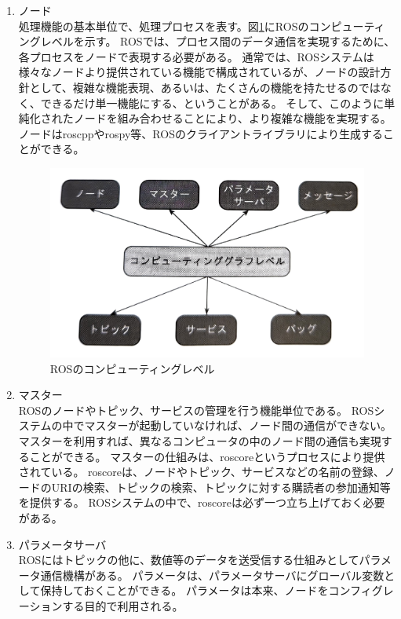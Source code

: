 \begin{enumerate}
  \item ノード\\
  処理機能の基本単位で、処理プロセスを表す。図\ref{auto:compute}にROSのコンピューティングレベルを示す。
  ROSでは、プロセス間のデータ通信を実現するために、各プロセスをノードで表現する必要がある。
  通常では、ROSシステムは様々なノードより提供されている機能で構成されているが、ノードの設計方針として、複雑な機能表現、あるいは、たくさんの機能を持たせるのではなく、できるだけ単一機能にする、ということがある。
  そして、このように単純化されたノードを組み合わせることにより、より複雑な機能を実現する。
  ノードはroscppやrospy等、ROSのクライアントライブラリにより生成することができる。
  \begin{figure}[h]
    \begin{center}
      \includegraphics[width=.75\linewidth]{img/auto_7.pdf}
      \caption{ROSのコンピューティングレベル}
      \label{auto:compute}
    \end{center}
  \end{figure}
  \item マスター\\
  ROSのノードやトピック、サービスの管理を行う機能単位である。
  ROSシステムの中でマスターが起動していなければ、ノード間の通信ができない。
  マスターを利用すれば、異なるコンピュータの中のノード間の通信も実現することができる。
  マスターの仕組みは、roscoreというプロセスにより提供されている。
  roscoreは、ノードやトピック、サービスなどの名前の登録、ノードのURIの検索、トピックの検索、トピックに対する購読者の参加通知等を提供する。
  ROSシステムの中で、roscoreは必ず一つ立ち上げておく必要がある。
  \item パラメータサーバ\\
  ROSにはトピックの他に、数値等のデータを送受信する仕組みとしてパラメータ通信機構がある。
  パラメータは、パラメータサーバにグローバル変数として保持しておくことができる。
  パラメータは本来、ノードをコンフィグレーションする目的で利用される。

\end{enumerate}
